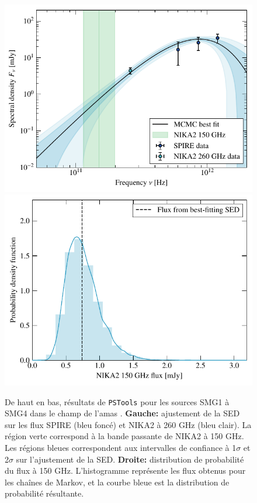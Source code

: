 \begin{figure}[p]
    \includegraphics[height=0.23\textheight]{Figures/Chap_actj0215/PSPlots/4_SED_no2mm.pdf} \hspace{20pt}
    \includegraphics[height=0.23\textheight]{Figures/Chap_actj0215/PSPlots/4_2mm_flux_dist.pdf}
    \caption{
        De haut en bas, résultats de \texttt{PSTools} pour les sources SMG1 à SMG4 dans le champ de l'amas \act.
        \textbf{Gauche:} ajustement de la SED sur les flux SPIRE (bleu foncé) et NIKA2 à 260 GHz (bleu clair).
        La région verte correspond à la bande passante de NIKA2 à 150 GHz.
        Les régions bleues correspondent aux intervalles de confiance à 1$\sigma$ et 2$\sigma$ sur l'ajustement de la SED.
        \textbf{Droite:} distribution de probabilité du flux à 150 GHz.
        L'histogramme représente les flux obtenus pour les chaînes de Markov, et la courbe bleue est la distribution de probabilité résultante.
    }
    \label{fig:act:sed}
\end{figure}

